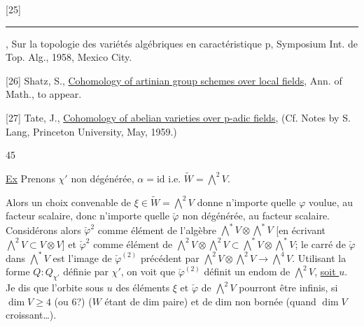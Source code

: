 [25] \rule{2cm}{0.4pt}, Sur la topologie des variétés algébriques en caractéristique p, Symposium Int. de Top. Alg., 1958, Mexico City.

[26] Shatz, S., \uline{Cohomology of artinian group schemes over local fields}, Ann. of Math., to appear.

[27] Tate, J., \uline{Cohomology of abelian varieties over p-adic fields}, (Cf. Notes by S. Lang, Princeton University, May, 1959.)

\begin{center}45\end{center}


\uline{Ex} Prenons $\chi'$ non dégénérée,  $\alpha=\mathrm{id}$ i.e. $\widetilde W=\bigwedge^2V$.

Alors un choix convenable de $\xi\in\widetilde W=\bigwedge^2V$ donne n'importe quelle $\varphi$ voulue, au facteur scalaire, donc n'importe quelle $\check\varphi$  non dégénérée, au facteur scalaire. Considérons alors $\check\varphi^2$ comme élément de  l'algèbre $\bigwedge^*V\otimes\bigwedge^*V$ [en écrivant $\bigwedge^2V\subset V\otimes V$] et $\check\varphi^2$ comme élément de $\bigwedge^2V\otimes\bigwedge^2V\subset\bigwedge^*V\otimes\bigwedge^*V$; le carré de $\check\varphi$ dans $\bigwedge^*V$  est l'image de $\check\varphi^{(2)}$ précédent par $\bigwedge^2V\otimes\bigwedge^2V\longrightarrow\bigwedge^4V$. Utilisant la forme $Q:Q_{\chi'}$ définie par $\chi'$, on voit que $\check\varphi^{(2)}$ définit un endom de $\bigwedge^2V$, \uline{soit $u$}. Je dis que l'orbite sous $u$ des éléments $\xi$ et $\check\varphi$ de $\bigwedge^2V$ pourront être infinis, si $\dim V\geq4$ (ou $6$?) ($W$ étant de dim paire) et   de dim non bornée (quand $\dim V$ croissant\ldots).
\deleted{$\unsure{\xi}$}


